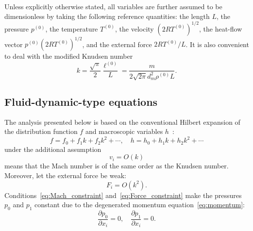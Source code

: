 \documentclass[smallextended, final]{svjour3} %
\newcommand{\pder}[2][]{\frac{\partial#1}{\partial#2}}
\begin{document}
Unless explicitly otherwise stated, all variables are further assumed to be dimensionless
by taking the following reference quantities:
the length \(L\), the pressure \(p^{(0)}\), the temperature \(T^{(0)}\),
the velocity \((2RT^{(0)})^{1/2}\), the heat-flow vector \(p^{(0)}(2RT^{(0)})^{1/2}\),
and the external force \(2RT^{(0)}/L\).
It is also convenient to deal with the modified Knudsen number
\[ k = \frac{\sqrt\pi}2\frac{\ell^{(0)}}{L} = \frac{m}{2\sqrt{2\pi} d_m^2 \rho^{(0)}L}. \]

\subsection{Fluid-dynamic-type equations}

The analysis presented below is based on the conventional Hilbert expansion
of the distribution function \(f\) and macroscopic variables \(h\)~\cite{Hilbert1912}:
\[ f = f_0 + f_1k + f_2k^2 + \cdots, \quad h = h_0 + h_1k + h_2k^2 + \cdots \]
under the additional assumption
\begin{equation}\label{eq:Mach_constraint}
    v_i = O(k)
\end{equation}
means that the Mach number is of the same order as the Knudsen number.
Moreover, let the external force be weak:
\begin{equation}\label{eq:Force_constraint}
    F_i = O(k^2).
\end{equation}
Conditions~\eqref{eq:Mach_constraint} and~\eqref{eq:Force_constraint} make the pressures
\(p_0\) and \(p_1\) constant due to the degenerated momentum equation~\eqref{eq:momentum}:
\begin{equation}
    \pder[p_0]{x_i} = 0, \quad \pder[p_1]{x_i} = 0.
\end{equation}
\end{document}
